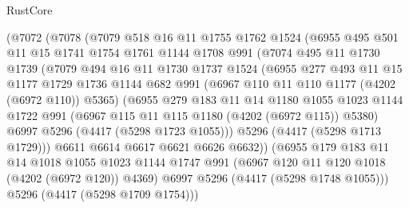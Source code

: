 \begin{lexlean}{RustCore}
\begin{coremodule}
            (@7072
              (@7078
                (@7079
                  @518
                  @16
                  @11
                  @1755
                  @1762
                  @1524
                  (@6955
                    @495
                    @501
                    @11
                    @15
                    @1741
                    @1754
                    @1761
                    @1144
                    @1708
                    @991
                    (@7074
                      @495
                      @11
                      @1730
                      @1739
                      (@7079
                        @494
                        @16
                        @11
                        @1730
                        @1737
                        @1524
                        (@6955
                          @277
                          @493
                          @11
                          @15
                          @1177
                          @1729
                          @1736
                          @1144
                          @682
                          @991
                          (@6967 @110 @11 @110 @1177 (@4202 (@6972 @110)) @5365)
                          (@6955
                            @279
                            @183
                            @11
                            @14
                            @1180
                            @1055
                            @1023
                            @1144
                            @1722
                            @991
                            (@6967 @115 @11 @115 @1180 (@4202 (@6972 @115)) @5380)
                            @6997
                            @5296
                            (@4417 (@5298 @1723 @1055)))
                          @5296
                          (@4417 (@5298 @1713 @1729)))
                        @6611
                        @6614
                        @6617
                        @6621
                        @6626
                        @6632))
                    (@6955
                      @179
                      @183
                      @11
                      @14
                      @1018
                      @1055
                      @1023
                      @1144
                      @1747
                      @991
                      (@6967 @120 @11 @120 @1018 (@4202 (@6972 @120)) @4369)
                      @6997
                      @5296
                      (@4417 (@5298 @1748 @1055)))
                    @5296
                    (@4417 (@5298 @1709 @1754)))

\end{coremodule}
\end{lexlean}
